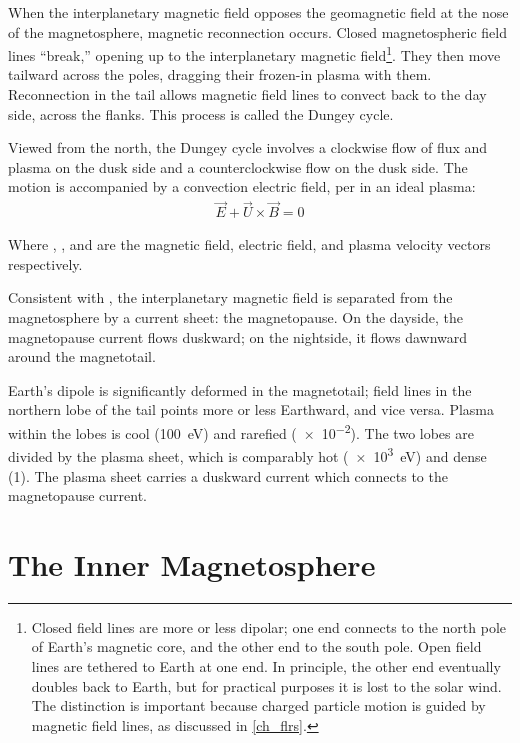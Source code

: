When the interplanetary magnetic field opposes the geomagnetic field at the
nose of the magnetosphere, magnetic reconnection occurs. Closed magnetospheric
field lines ``break,'' opening up to the interplanetary magnetic
field\footnote{Closed field lines are more or less dipolar; one end connects to
the north pole of Earth's magnetic core, and the other end to the south pole.
Open field lines are tethered to Earth at one end. In principle, the other end
eventually doubles back to Earth, but for practical purposes it is lost to the
solar wind. The distinction is important because charged particle motion is
guided by magnetic field lines, as discussed in \cref{ch_flrs}. }. They then
move tailward across the poles, dragging their frozen-in plasma with them.
Reconnection in the tail allows magnetic field lines to convect back to the day
side, across the flanks. This process is called the Dungey
cycle\cite{dungey_1961}. 

Viewed from the north, the Dungey cycle involves a clockwise flow of flux and
plasma on the dusk side and a counterclockwise flow on the dusk side. The
motion is accompanied by a convection electric field, per \ohmlaw in an ideal
plasma:
\begin{align}
  \vec{E} + \vec{U} \times \vec{B} = 0
\end{align}

Where , , and  are the magnetic field, electric field, and
plasma velocity vectors respectively. 

Consistent with \amplaw, the interplanetary magnetic field is separated from
the magnetosphere by a current sheet: the magnetopause. On the dayside, the
magnetopause current flows duskward; on the nightside, it flows dawnward around
the magnetotail. 

Earth's dipole is significantly deformed in the magnetotail; field lines in the
northern lobe of the tail points more or less Earthward, and vice versa. Plasma
within the lobes is cool (\about\SI{100}{\eV}) and rarefied
(\about\SI{e-2}{\percc}). The two lobes are divided by the plasma sheet, which
is comparably hot (\about\SI{e3}{\eV}) and dense (\about\SI{1}{\percc}). The
plasma sheet carries a duskward current which connects to the magnetopause
current. 

\section{The Inner Magnetosphere}

